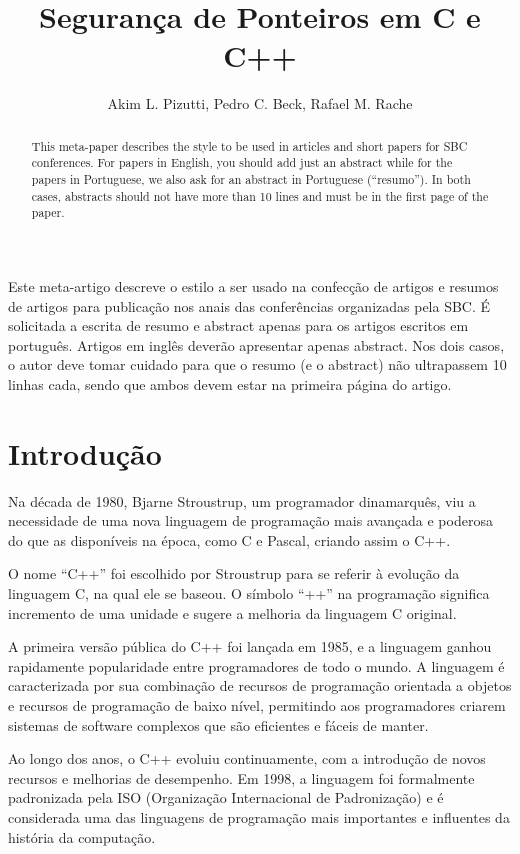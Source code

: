 \documentclass[12pt]{article}
\title{Segurança de Ponteiros em C e C++}
\author{Akim L. Pizutti, Pedro C. Beck, Rafael M. Rache}
\begin{document}
 

\maketitle

\begin{abstract}
  This meta-paper describes the style to be used in articles and short papers
  for SBC conferences. For papers in English, you should add just an abstract
  while for the papers in Portuguese, we also ask for an abstract in
  Portuguese (``resumo''). In both cases, abstracts should not have more than
  10 lines and must be in the first page of the paper.
\end{abstract}
     
\begin{resumo} 
  Este meta-artigo descreve o estilo a ser usado na confecção de artigos e
  resumos de artigos para publicação nos anais das conferências organizadas
  pela SBC. É solicitada a escrita de resumo e abstract apenas para os artigos
  escritos em português. Artigos em inglês deverão apresentar apenas abstract.
  Nos dois casos, o autor deve tomar cuidado para que o resumo (e o abstract)
  não ultrapassem 10 linhas cada, sendo que ambos devem estar na primeira
  página do artigo.
\end{resumo}


\section{Introdução}

Na década de 1980, Bjarne Stroustrup, um programador dinamarquês, viu a necessidade de uma nova linguagem de programação mais avançada e poderosa do que as disponíveis na época, como C e Pascal, criando assim o C++.

O nome ``C++'' foi escolhido por Stroustrup para se referir à evolução da linguagem C, na qual ele se baseou. O símbolo ``++'' na programação significa incremento de uma unidade e sugere a melhoria da linguagem C original.

A primeira versão pública do C++ foi lançada em 1985, e a linguagem ganhou rapidamente popularidade entre programadores de todo o mundo. A linguagem é caracterizada por sua combinação de recursos de programação orientada a objetos e recursos de programação de baixo nível, permitindo aos programadores criarem sistemas de software complexos que são eficientes e fáceis de manter.

Ao longo dos anos, o C++ evoluiu continuamente, com a introdução de novos recursos e melhorias de desempenho. Em 1998, a linguagem foi formalmente padronizada pela ISO (Organização Internacional de Padronização) e é considerada uma das linguagens de programação mais importantes e influentes da história da computação.
\end{document}
